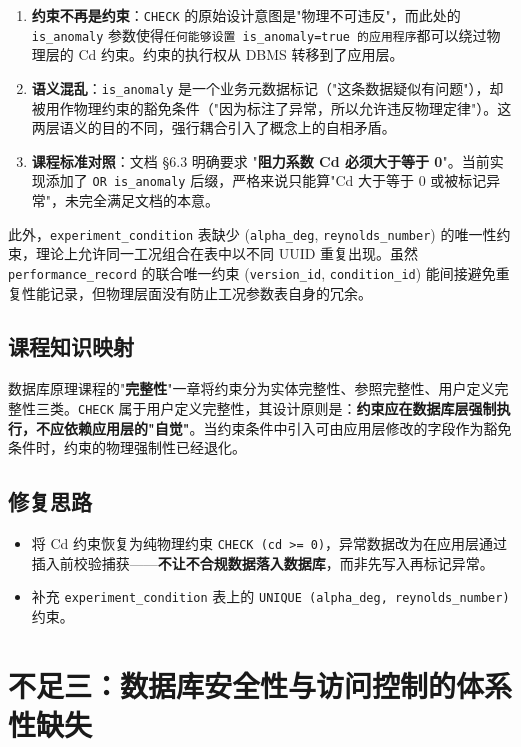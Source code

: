 \documentclass[UTF8,a4paper,11pt]{ctexart}
\begin{document}
\begin{enumerate}
    \item \textbf{约束不再是约束}：\texttt{CHECK} 的原始设计意图是"物理不可违反"，而此处的 \texttt{is\_anomaly} 参数使得\texttt{任何能够设置 is\_anomaly=true 的应用程序}都可以绕过物理层的 Cd 约束。约束的执行权从 DBMS 转移到了应用层。
    \item \textbf{语义混乱}：\texttt{is\_anomaly} 是一个业务元数据标记（"这条数据疑似有问题"），却被用作物理约束的豁免条件（"因为标注了异常，所以允许违反物理定律"）。这两层语义的目的不同，强行耦合引入了概念上的自相矛盾。
    \item \textbf{课程标准对照}：文档 §6.3 明确要求 "\textbf{阻力系数 Cd 必须大于等于 0}"。当前实现添加了 \texttt{OR is\_anomaly} 后缀，严格来说只能算"Cd 大于等于 0 或被标记异常"，未完全满足文档的本意。
\end{enumerate}

此外，\texttt{experiment\_condition} 表缺少 (\texttt{alpha\_deg}, \texttt{reynolds\_number}) 的唯一性约束，理论上允许同一工况组合在表中以不同 UUID 重复出现。虽然 \texttt{performance\_record} 的联合唯一约束 (\texttt{version\_id}, \texttt{condition\_id}) 能间接避免重复性能记录，但物理层面没有防止工况参数表自身的冗余。

\subsection{课程知识映射}

数据库原理课程的"\textbf{完整性}"一章将约束分为实体完整性、参照完整性、用户定义完整性三类。\texttt{CHECK} 属于用户定义完整性，其设计原则是：\textbf{约束应在数据库层强制执行，不应依赖应用层的"自觉"}。当约束条件中引入可由应用层修改的字段作为豁免条件时，约束的物理强制性已经退化。

\subsection{修复思路}

\begin{itemize}
    \item 将 Cd 约束恢复为纯物理约束 \texttt{CHECK (cd >= 0)}，异常数据改为在应用层通过插入前校验捕获——\textbf{不让不合规数据落入数据库}，而非先写入再标记异常。
    \item 补充 \texttt{experiment\_condition} 表上的 \texttt{UNIQUE (alpha\_deg, reynolds\_number)} 约束。
\end{itemize}

\section{不足三：数据库安全性与访问控制的体系性缺失}
\end{document}
